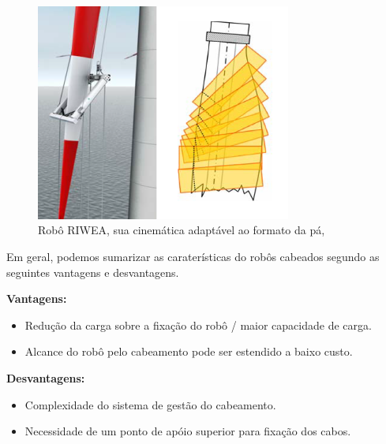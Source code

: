 \begin{figure}[!h]
	\centering
	\includegraphics[width=8.4cm]{figs/cables/riwea}
	\caption{Robô RIWEA, sua cinemática adaptável ao formato da pá, \cite{riwea}}
	\label{fig:cables:riwea}
\end{figure}

Em geral, podemos sumarizar as caraterísticas do robôs cabeados segundo as
seguintes vantagens e desvantagens.

\textbf{Vantagens:}
\begin{itemize}
  \item Redução da carga sobre a fixação do robô / maior capacidade de carga.
  \item Alcance do robô pelo cabeamento pode ser estendido a baixo custo.  
\end{itemize}

\textbf{Desvantagens:}
\begin{itemize}
  \item Complexidade do sistema de gestão do cabeamento.
  \item Necessidade de um ponto de apóio superior para fixação dos cabos.
\end{itemize}


